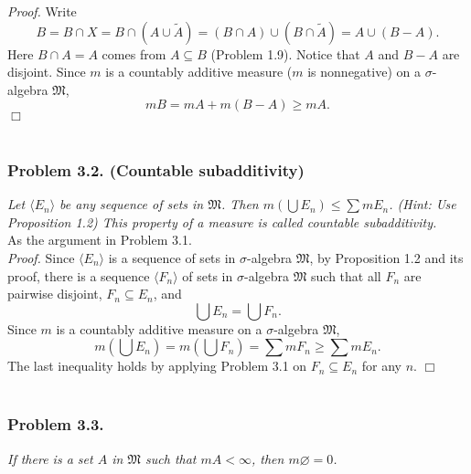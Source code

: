 \documentclass{article}
\begin{document}
\emph{Proof.}
Write
\[
  B
  = B \cap X
  = B \cap (A \cup \widetilde{A})
  = (B \cap A) \cup (B \cap \widetilde{A})
  = A \cup (B - A).
\]
Here $B \cap A = A$ comes from $A \subseteq B$ (Problem 1.9).
Notice that $A$ and $B - A$ are disjoint.
Since $m$ is a countably additive measure ($m$ is nonnegative)
on a $\sigma$-algebra $\mathfrak{M}$,
\[
  mB = mA + m(B-A) \geq mA.
\]
$\Box$ \\\\






\subsubsection*{Problem 3.2. (Countable subadditivity)}
\emph{Let $\langle E_n \rangle$ be any sequence of sets in $\mathfrak{M}$.
Then $m(\bigcup E_n) \leq \sum mE_n$. (Hint: Use Proposition 1.2)
This property of a measure is called countable subadditivity.} \\

As the argument in Problem 3.1. \\



\emph{Proof.}
Since $\langle E_n \rangle$ is a sequence of sets in $\sigma$-algebra $\mathfrak{M}$,
by Proposition 1.2 and its proof,
there is a sequence $\langle F_n \rangle$ of sets in $\sigma$-algebra $\mathfrak{M}$
such that all $F_n$ are pairwise disjoint, $F_n \subseteq E_n$, and
$$\bigcup E_n = \bigcup F_n.$$
Since $m$ is a countably additive measure
on a $\sigma$-algebra $\mathfrak{M}$,
\[
  m\left( \bigcup E_n \right)
  = m\left( \bigcup F_n \right)
  = \sum mF_n
  \geq \sum mE_n.
\]
The last inequality holds by applying Problem 3.1 on $F_n \subseteq E_n$ for any $n$.
$\Box$ \\\\






\subsubsection*{Problem 3.3.}
\emph{If there is a set $A$ in $\mathfrak{M}$ such that $mA < \infty$,
then $m\varnothing = 0$.} \\
\end{document}
